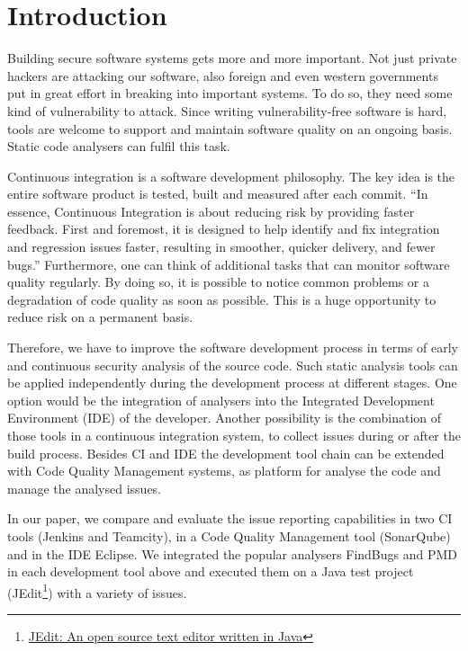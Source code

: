 \documentclass[conference]{IEEEtran}
\begin{document}
\section{Introduction}
\label{sec:introduction}
Building secure software systems gets more and more important. Not just private hackers are attacking our software, also foreign and even western governments put in great effort in breaking into important systems\cite{NSAHacking}. To do so, they need some kind of vulnerability to attack. Since writing vulnerability-free software is hard, tools are welcome to support and maintain software quality on an ongoing basis. Static code analysers can fulfil this task.


Continuous integration is a software development philosophy. The key idea is the entire software product is tested, built and measured after each commit. ``In essence, Continuous Integration is about reducing risk by providing faster feedback. First and foremost, it is designed to help identify and fix integration and regression issues faster, resulting in smoother, quicker delivery, and fewer bugs.''\cite{Jenkins:Smart:2011} Furthermore, one can think of additional tasks that can monitor software quality regularly. By doing so, it is possible to notice common problems or a degradation of code quality as soon as possible. This is a huge opportunity to reduce risk on a permanent basis.


Therefore, we have to improve the software development process in terms of early and continuous security analysis of the source code.
Such static analysis tools can be applied independently during the development process at different stages.
One option would be the integration of analysers into the Integrated Development Environment (IDE) of the developer.
Another possibility is the combination of those tools in a continuous integration system, to collect issues during or after the build process.
Besides CI and IDE the development tool chain can be extended with Code Quality Management systems, as platform for analyse the code and manage the analysed issues.


In our paper, we compare and evaluate the issue reporting capabilities in two CI tools (Jenkins and Teamcity), in a Code Quality Management tool (SonarQube) and in the IDE Eclipse.
We integrated the popular analysers FindBugs and PMD in each development tool above and executed them on a Java test project (JEdit\footnote{\href{http://www.jedit.org/}{JEdit: An open source text editor written in Java}}) with a variety of issues.
\end{document}
